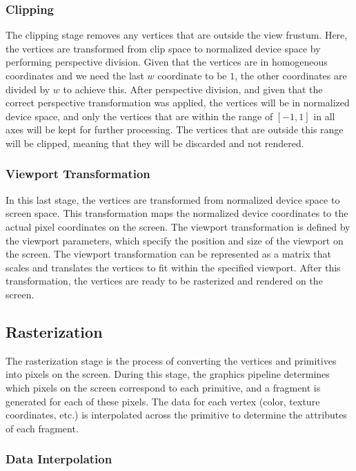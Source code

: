 \subsubsection{Clipping}

The clipping stage removes any vertices that are outside the view frustum. Here, the vertices are transformed from clip space to normalized device space by performing perspective division. Given that the vertices are in homogeneous coordinates and we need the last $w$ coordinate to be $1$, the other coordinates are divided by $w$ to achieve this. After perspective division, and given that the correct perspective transformation was applied, the vertices will be in normalized device space, and only the vertices that are within the range of $[-1, 1]$ in all axes will be kept for further processing. The vertices that are outside this range will be clipped, meaning that they will be discarded and not rendered.

\subsubsection{Viewport Transformation}

In this last stage, the vertices are transformed from normalized device space to screen space. This transformation maps the normalized device coordinates to the actual pixel coordinates on the screen. The viewport transformation is defined by the viewport parameters, which specify the position and size of the viewport on the screen. The viewport transformation can be represented as a matrix that scales and translates the vertices to fit within the specified viewport. After this transformation, the vertices are ready to be rasterized and rendered on the screen.


\subsection{Rasterization}

The rasterization stage is the process of converting the vertices and primitives into pixels on the screen. During this stage, the graphics pipeline determines which pixels on the screen correspond to each primitive, and a fragment is generated for each of these pixels. The data for each vertex (color, texture coordinates, etc.) is interpolated across the primitive to determine the attributes of each fragment.

\subsubsection{Data Interpolation}


